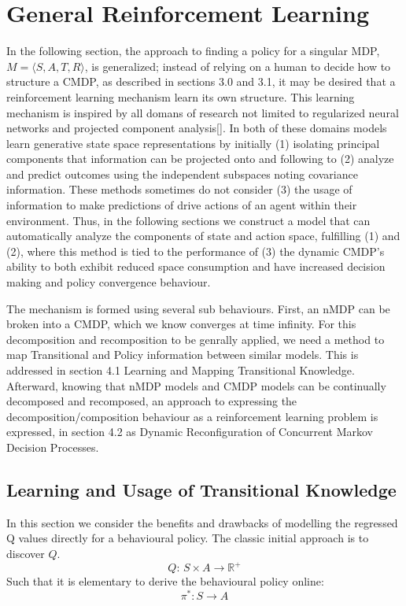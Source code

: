\documentclass[compsoc,journal,letterpaper,10pt,draftcls,twocolumn]{IEEEtran}
\begin{document}
\section{General Reinforcement
Learning}\label{general-reinforcement-learning}

In the following section, the approach to finding a policy for a
singular MDP, $M = \langle S, A, T, R \rangle$, is generalized; instead of relying on
a human to decide how to structure a CMDP, as described in sections 3.0
and 3.1, it may be desired that a reinforcement learning mechanism learn
its own structure. This learning mechanism is inspired by all domans of
research not limited to regularized neural networks and projected
component analysis{[}{]}. In both of these domains models learn
generative state space representations by initially (1) isolating
principal components that information can be projected onto and
following to (2) analyze and predict outcomes using the independent
subspaces noting covariance information. These methods sometimes do not
consider (3) the usage of information to make predictions of drive
actions of an agent within their environment. Thus, in the following
sections we construct a model that can automatically analyze the
components of state and action space, fulfilling (1) and (2), where this
method is tied to the performance of (3) the dynamic CMDP's ability to
both exhibit reduced space consumption and have increased decision
making and policy convergence behaviour.

The mechanism is formed using several sub behaviours. First, an nMDP can
be broken into a CMDP, which we know converges at time infinity. For
this decomposition and recomposition to be genrally applied, we need a
method to map Transitional and Policy information between similar
models. This is addressed in section 4.1 Learning and Mapping
Transitional Knowledge. Afterward, knowing that nMDP models and CMDP
models can be continually decomposed and recomposed, an approach to
expressing the decomposition/composition behaviour as a reinforcement
learning problem is expressed, in section 4.2 as Dynamic Reconfiguration
of Concurrent Markov Decision Processes.

\subsection{Learning and Usage of Transitional
Knowledge}\label{learning-and-usage-of-transitional-knowledge}

In this section we consider the benefits and drawbacks of modelling the
regressed Q values directly for a behavioural policy. The classic
initial approach is to discover $Q$.
\begin{equation}
Q:\,S \times A \rightarrow \mathbb{R}^{+}
\end{equation}
Such that it is elementary to derive the behavioural policy online:
\begin{equation}
\pi^{*}:S \rightarrow A
\end{equation}
\end{document}

